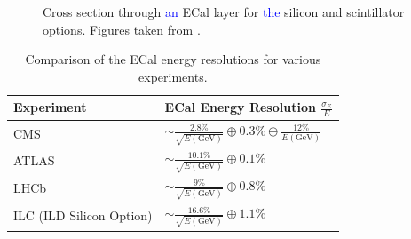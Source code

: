 \begin{figure}[h!]
\centering
{} 
\hspace{1cm}
\caption[Cross section through \textcolor{blue}{an} ECal layer for \textcolor{blue}{the} \protect{} silicon and \protect{} scintillator options.  Figures taken from  \cite{Behnke:2013lya}.]{Cross section through \textcolor{blue}{an} ECal layer for \textcolor{blue}{the} \protect{} silicon and \protect{} scintillator options.  Figures taken from  \cite{Behnke:2013lya}.}
\label{fig:ecalimage}
\end{figure} 

\begin{table}[h!]
\centering
\begin{tabular}{ l l }
\hline
Experiment & ECal Energy Resolution $\frac{\sigma_{E}}{E}$ \\
\hline
CMS \cite{Chatrchyan:2013dga} & $\sim \frac{2.8\%}{\sqrt{E(\text{GeV})}} \oplus 0.3\% \oplus \frac{12\%}{E(\text{GeV})}$ \\
ATLAS \cite{Aharrouche:2006nf} & $\sim \frac{10.1\%}{\sqrt{E(\text{GeV})}} \oplus 0.1\%$ \\
LHCb \cite{Perret:2014owa} & $\sim \frac{9\%}{\sqrt{E(\text{GeV})}} \oplus 0.8\%$ \\
ILC (ILD Silicon Option) \cite{Behnke:2013lya} & $\sim \frac{16.6\%}{\sqrt{E(\text{GeV})}} \oplus 1.1\%$ \\
\hline
\end{tabular}
\caption[Comparison of the ECal energy resolutions for various experiments.]{Comparison of the ECal energy resolutions for various experiments.}
\label{table:ecalenergyres}
\end{table}

